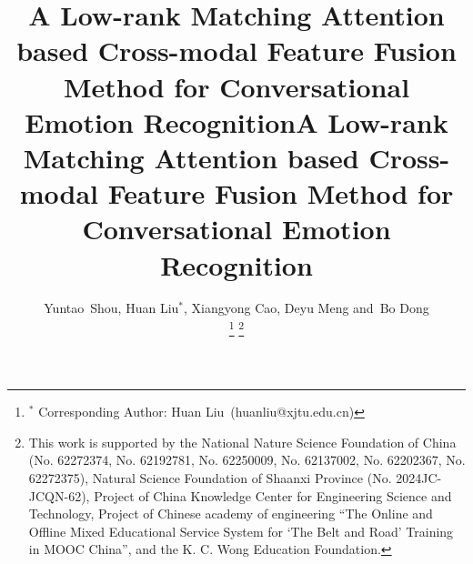 \title{A Low-rank Matching Attention based Cross-modal Feature Fusion Method for Conversational Emotion Recognition}



\title{A Low-rank Matching Attention based Cross-modal Feature Fusion Method for Conversational Emotion Recognition}

\author{Yuntao~Shou, Huan Liu$^*$, 
	Xiangyong Cao, Deyu Meng
	and~Bo Dong \\%
	\thanks{$^*$ Corresponding Author: Huan Liu~(huanliu@xjtu.edu.cn)}
	\thanks{This work is supported by the National Nature Science Foundation of
	China (No. 62272374, No. 62192781, No. 62250009, No. 62137002, No. 62202367, No. 62272375), Natural
	Science Foundation of Shaanxi Province (No. 2024JC-JCQN-62), Project of
	China Knowledge Center for Engineering Science and Technology, Project of
	Chinese academy of engineering “The Online and Offline Mixed Educational
	Service System for ‘The Belt and Road’ Training in MOOC China”, and the
	K. C. Wong Education Foundation.}
		
		
		
		
}

\maketitle

